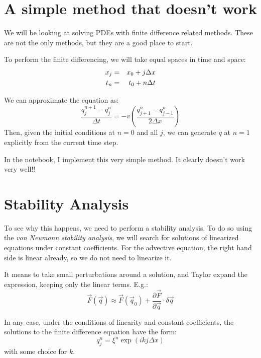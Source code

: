 \section{A simple method that doesn't work}

We will be looking at solving PDEs with finite difference related
methods. These are not the only methods, but they are a good place to
start.

To perform the finite differencing, we will take equal spaces in time
and space:
\begin{eqnarray}
x_j &=& x_0 + j \Delta x \cr
t_n &=& t_0 + n \Delta t
\end{eqnarray}

We can approximate the equation as:
\begin{equation}
  \frac{q_j^{n+1} - q_j^{n}}{\Delta t} = - v \left(
  \frac{q_{j+1}^n - q_{j-1}^n}{2\Delta x}
  \right)
\end{equation}
Then, given the initial conditions at $n=0$ and all $j$, we can
generate $q$ at $n=1$ explicitly from the current time step. 

In the notebook, I implement this very simple method. It clearly
doesn't work very well!!

\section{Stability Analysis}

To see why this happens, we need to perform a stability analysis. To
do so using the {\it von Neumann stability analysis}, we will search
for solutions of linearized equations under constant
coefficients. For the advective equation, the right hand side is
linear already, so we do not need to linearize it. 


\begin{answer}
It means to take small perturbations around a solution, and Taylor
expand the expression, keeping only the linear terms.  E.g.:
\begin{equation}
\vec{F}\left(\vec{q}\right) \approx \vec{F}\left(\vec{q}_0\right) +
\frac{\partial \vec{F}}{\partial \vec{q}} \cdot \delta\vec{q}
\end{equation}
\end{answer}

In any case, under the conditions of linearity and constant
coefficients, the solutions to the finite difference equation have the
form:
\begin{equation}
q_j^n = \xi^n \exp\left(i k j \Delta x\right)
\end{equation}
with some choice for $k$. 

